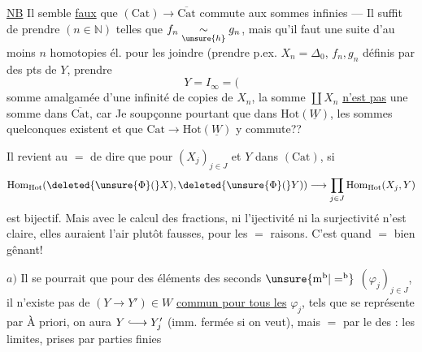 \uline{NB} Il semble \uline{faux} que $(\mathrm{Cat})\longrightarrow\overline{\mathrm{Cat}}$ commute aux sommes infinies --- Il suffit de prendre   
$(n\in\mathbb N)$ telles que $f_n\underset{\unsure{h}}\sim g_n$, mais qu'il faut une suite d'au moins $n$ homotopies él. pour les joindre (prendre p.ex. $X_n=\Delta_0$, $f_n,g_n$ définis par des pts de $Y$, prendre
\[
Y=I_\infty=(
\]
somme amalgamée d'une infinité de copies de $X_n$,   la somme $\coprod X_n$ \uline{n'est pas} une somme dans $\overline{\mathrm{Cat}}$, car Je soupçonne pourtant que dans $\mathrm{Hot}(\underline W)$, les sommes quelconques existent et que $\mathrm{Cat}\longrightarrow\mathrm{Hot}(\underline W)$ y commute??



Il revient au $=$ de dire que pour $(X_j)_{j\in J}$ et $Y$ dans $(\mathrm{Cat})$, si 
\[
\operatorname{Hom}_{\mathrm{Hot}}(\deleted{\unsure{\Phi}(}X),\deleted{\unsure{\Phi}(}Y))\longrightarrow\prod_{j\in J}\operatorname{Hom}_{\mathrm{Hot}}(X_j,Y)
\]
est bijectif. Mais avec le calcul des fractions, ni l'ijectivité ni la surjectivité n'est claire, elles auraient l'air plutôt fausses, pour les $=$ raisons. C'est quand $=$ bien gênant! 

$a)$ Il se pourrait que pour des  éléments des seconds $\unsure{\mathrm m^{\mathrm b}|=^{\mathrm b}}$ $(\varphi_j)_{j\in J}$, il n'existe pas de $(Y\longrightarrow Y')\in W$ \uline{commun pour tous les} $\varphi_j$, tels que
se représente par
À priori, on aura $Y\lhook\joinrel\longrightarrow Y'_j$ (imm. fermée si on veut), mais  $=$ par le  des : les limites, prises par parties finies

